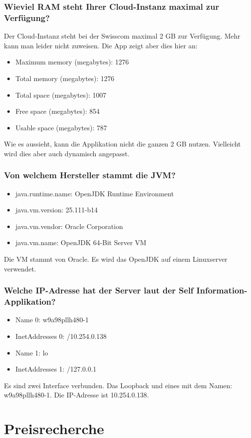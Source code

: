 \subsection{Wieviel RAM steht Ihrer Cloud-Instanz maximal zur Verfügung?}
Der Cloud-Instanz steht bei der Swisscom maximal 2 GB zur Verfügung. Mehr kann man leider nicht zuweisen.
Die App zeigt aber dies hier an:
\begin{itemize}
\item		Maximum memory (megabytes): 1276
\item		Total memory (megabytes): 1276
\item		Total space (megabytes): 1007
\item		Free space (megabytes): 854
\item		Usable space (megabytes): 787
\end{itemize}
Wie es aussieht, kann die Applikation nicht die ganzen 2 GB nutzen. Vielleicht wird dies aber auch dynamisch angepasst.
\subsection{Von welchem Hersteller stammt die JVM?}
\begin{itemize}
\item		java.runtime.name: OpenJDK Runtime Environment
\item		java.vm.version: 25.111-b14
\item		java.vm.vendor: Oracle Corporation
\item		java.vm.name: OpenJDK 64-Bit Server VM
\end{itemize}
Die VM stammt von Oracle. Es wird das OpenJDK auf einem Linuxserver verwendet.
\subsection{Welche IP-Adresse hat der Server laut der Self Information-Applikation?}
\begin{itemize}
\item		Name 0: w9a98pllh480-1
\item		InetAddresses 0: /10.254.0.138
\item		Name 1: lo
\item		InetAddresses 1: /127.0.0.1
\end{itemize}
Es sind zwei Interface verbunden. Das Loopback und eines mit dem Namen: w9a98pllh480-1. Die IP-Adresse ist 10.254.0.138. 
\chapter{Preisrecherche}
